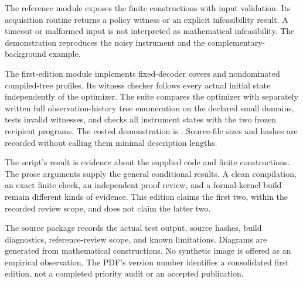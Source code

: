 \documentclass[11pt,oneside,openany]{book}
\numberwithin{equation}{section}
\begin{document}
The reference module  exposes the finite constructions with input validation. Its acquisition routine returns a policy witness or an explicit infeasibility result. A timeout or malformed input is not interpreted as mathematical infeasibility. The demonstration  reproduces the noisy instrument and the complementary-background example.

The first-edition module  implements fixed-decoder covers and nondominated compiled-tree profiles. Its witness checker follows every actual initial state independently of the optimizer. The suite  compares the optimizer with separately written full observation-history tree enumeration on the declared small domains, tests invalid witnesses, and checks all instrument states with the two frozen recipient programs. The costed demonstration is . Source-file sizes and hashes are recorded without calling them minimal description lengths.

The script's result is evidence about the supplied code and finite constructions. The prose arguments supply the general conditional results. A clean compilation, an exact finite check, an independent proof review, and a formal-kernel build remain different kinds of evidence. This edition claims the first two, within the recorded review scope, and does not claim the latter two.

The source package records the actual test output, source hashes, build diagnostics, reference-review scope, and known limitations. Diagrams are generated from mathematical constructions. No synthetic image is offered as an empirical observation. The PDF's version number identifies a consolidated first edition, not a completed priority audit or an accepted publication.
\end{document}
